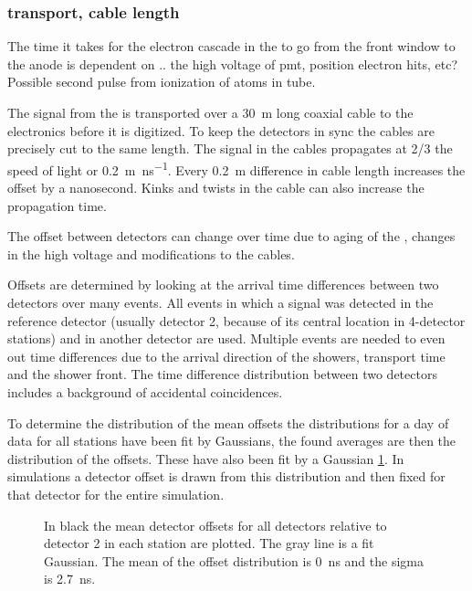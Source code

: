 \subsubsection{\pmt transport, cable length}

The time it takes for the electron cascade in the \pmt to go from the
front window to the anode is dependent on .. the high voltage of pmt,
position electron hits, etc? Possible second pulse from ionization of
atoms in tube.

The signal from the \pmt is transported over a \SI{30}{\meter} long
coaxial cable to the \hisparc electronics before it is digitized. To
keep the detectors in sync the cables are precisely cut to the
same length. The signal in the cables propagates at 2/3 the speed of
light or \SI{.2}{\meter\per\ns}. Every \SI{.2}{\meter}
difference in cable length increases the offset by a nanosecond. Kinks
and twists in the cable can also increase the propagation time.

The offset between detectors can change over time due to aging of the
\pmt, changes in the high voltage and modifications to the cables.

Offsets are determined by looking at the arrival time differences
between two detectors over many events. All events in which a signal was
detected in the reference detector (usually detector 2, because of its
central location in 4-detector stations) and in another detector are
used. Multiple events are needed to even out time differences due to the
arrival direction of the showers, transport time and the shower front.
The time difference distribution between two detectors includes a
background of accidental coincidences.

To determine the distribution of the mean offsets the distributions for
a day of data for all stations have been fit by Gaussians, the found
averages are then the distribution of the offsets. These have also been
fit by a Gaussian \cref{fig:detector_offset_distribution}. In
simulations a detector offset is drawn from this distribution and then
fixed for that detector for the entire simulation.


\begin{figure}
    \centering
    
    \caption{ In black the mean
             detector offsets for all detectors relative to detector 2
             in each station are plotted. The gray line is a fit
             Gaussian. The mean of the offset distribution is
             \SI{0}{\ns} and the sigma is
             \SI{2.7}{\ns}.}
    \label{fig:detector_offset_distribution}
\end{figure}


